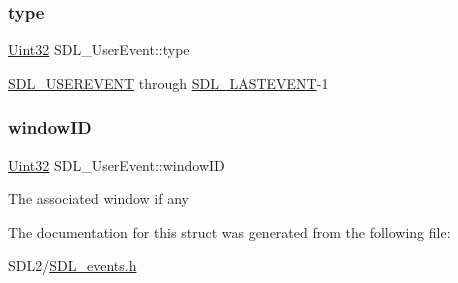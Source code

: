 \subsubsection{\texorpdfstring{type}{type}}
{\footnotesize\ttfamily \hyperlink{_s_d_l__stdinc_8h_add440eff171ea5f55cb00c4a9ab8672d}{Uint32} S\+D\+L\+\_\+\+User\+Event\+::type}

\hyperlink{_s_d_l__events_8h_a3b589e89be6b35c02e0dd34a55f3fccaa4364c23f54802309e83fdb9b1c07c719}{S\+D\+L\+\_\+\+U\+S\+E\+R\+E\+V\+E\+NT} through \hyperlink{_s_d_l__events_8h_a3b589e89be6b35c02e0dd34a55f3fccaaffeac40a4ff366717c0ebc74118ea2ae}{S\+D\+L\+\_\+\+L\+A\+S\+T\+E\+V\+E\+NT}-\/1 \mbox{\label{struct_s_d_l___user_event_abccefa10e0e0e3a0801bc6d836a08da7}} 
\subsubsection{\texorpdfstring{window\+ID}{windowID}}
{\footnotesize\ttfamily \hyperlink{_s_d_l__stdinc_8h_add440eff171ea5f55cb00c4a9ab8672d}{Uint32} S\+D\+L\+\_\+\+User\+Event\+::window\+ID}

The associated window if any 

The documentation for this struct was generated from the following file\+:\begin{DoxyCompactItemize}
\item 
S\+D\+L2/\hyperlink{_s_d_l__events_8h}{S\+D\+L\+\_\+events.\+h}\end{DoxyCompactItemize}
